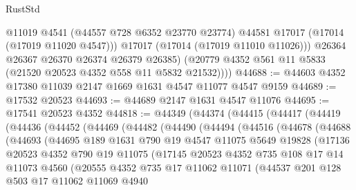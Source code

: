 \begin{lexlean}{RustStd}
\begin{coremodule}
{\begin{coremodule}
{{{{{{{{{{{{{{{{{{{{{{{{{{{{{{{{{{{{{{{{{{{{{{{{{{{{{{{              @11019
              @4541
              (@44557 @728 @6352 @23770 @23774)
              @44581
              @17017
              (@17014 (@17019 @11020 @4547)))
            @17017
            (@17014 (@17019 @11010 @11026)))
          @26364
          @26367
          @26370
          @26374
          @26379
          @26385)
        (@20779 @4352 @561 @11 @5833 (@21520 @20523 @4352 @558 @11 @5832 @21532))))
@44688 := @44603 @4352 @17380 @11039 @2147 @1669 @1631 @4547 @11077 @4547 @9159
@44689 := @17532 @20523
@44693 := @44689 @2147 @1631 @4547 @11076
@44695 := @17541 @20523 @4352
@44818 := @44349
    (@44374
      (@44415
        (@44417
          (@44419
            (@44436
              (@44452
                (@44469
                  (@44482
                    (@44490
                      (@44494
                        (@44516
                          (@44678
                            (@44688
                              (@44693
                                (@44695
                                  @189
                                  @1631
                                  @790
                                  @19
                                  @4547
                                  @11075
                                  @5649
                                  @19828
                                  (@17136
                                    @20523
                                    @4352
                                    @790
                                    @19
                                    @11075
                                    (@17145
                                      @20523
                                      @4352
                                      @735
                                      @108
                                      @17
                                      @14
                                      @11073
                                      @4560
                                      (@20555
                                        @4352
                                        @735
                                        @17
                                        @11062
                                        @11071
                                        (@44537
                                          @201
                                          @128
                                          @503
                                          @17
                                          @11062
                                          @11069
                                          @4940
}}}}}}}}}}}}}}}}}}}}}}}}}}}}}}}}}}}}}}}}}}}}}}}}}}}}}}}
\end{coremodule}}
\end{coremodule}
\end{lexlean}
